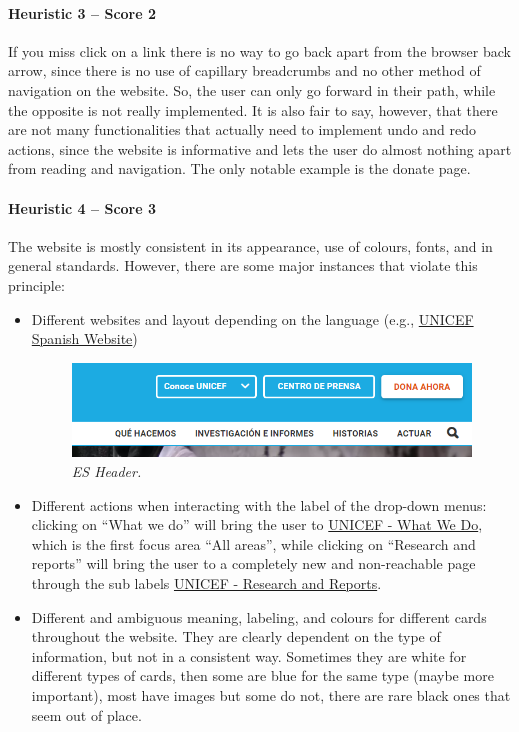 \paragraph*{Heuristic 3 – Score 2}
If you miss click on a link there is no way to go back apart from the browser back arrow, since there is no use of capillary breadcrumbs and no other method of navigation on the website. So, the user can only go forward in their path, while the opposite is not really implemented.
It is also fair to say, however, that there are not many functionalities that actually need to implement undo and redo actions, since the website is informative and lets the user do almost nothing apart from reading and navigation. The only notable example is the donate page.

\paragraph*{Heuristic 4 – Score 3}
The website is mostly consistent in its appearance, use of colours, fonts, and in general standards. However, there are some major instances that violate this principle:
\begin{itemize}
	\item Different websites and layout depending on the language (e.g., \href{https://www.unicef.org/es}{UNICEF Spanish Website})
	\begin{figure}[h]
		\includegraphics[width=\textwidth]{Picture4.png}
		\captionsetup{font=small}
		\caption{\textit{ES Header.}}
		\label{fig:label4}
	\end{figure}
	\item Different actions when interacting with the label of the drop-down menus: clicking on “What we do” will bring the user to \href{https://www.unicef.org/what-we-do}{UNICEF - What We Do}, which is the first focus area “All areas”, while clicking on “Research and reports” will bring the user to a completely new and non-reachable page through the sub labels \href{https://www.unicef.org/research-and-reports}{UNICEF - Research and Reports}.
	\item Different and ambiguous meaning, labeling, and colours for different cards throughout the website. They are clearly dependent on the type of information, but not in a consistent way. Sometimes they are white for different types of cards, then some are blue for the same type (maybe more important), most have images but some do not, there are rare black ones that seem out of place.
\end{itemize}
